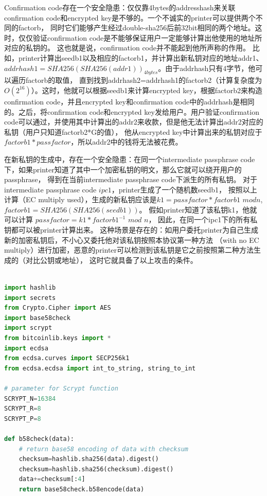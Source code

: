 Confirmation code存在一个安全隐患：仅仅靠4bytes的addresshash来关联
confirmation code和encrypted key是不够的。一个不诚实的printer可以提供两个不同的factorb，
同时它们能够产生经过double-sha256后前32bit相同的两个地址。这时，仅仅验证confirmation code是不能够保证用户一定能够计算出他使用的地址所对应的私钥的。
这也就是说，confirmation code并不能起到他所声称的作用。
比如，printer计算出seedb1以及相应的factorb1，并计算出新私钥对应的地址addr1、
$addrhash1=SHA256(SHA256(addr1))_{4bytes}$。由于addrhash只有4字节，他可以遍历factorb的取值，
直到找到addrhash2=addrhash1的factorb2（计算复杂度为$O(2^{16})$）。这时，他就可以根据seedb1来计算encrypted key，根据factorb2来构造confirmation code，并且encrypted key和confirmation 
code中的addrhash是相同的。之后，将confirmation code和encrypted key发给用户。用户验证confirmation code可以通过，并使用其中计算出的addr2来收款，但是他无法计算出addr2对应的私钥（用户只知道factorb2*G的值），
他从encrypted key中计算出来的私钥对应于 $factorb1 * passfactor$，所以addr2中的钱将无法被花费。

在新私钥的生成中，存在一个安全隐患：在同一个intermediate passphrase code下，如果printer知道了其中一个加密私钥的明文，那么它就可以绕开用户的passphrase，
得到在当前intermediate passphrase code下派生的所有私钥。
 对于intermediate passphrase code $ipc1$，printer生成了一个随机数seedb1，
 按照以上计算（EC multiply used），生成的新私钥应该是$k1=passfactor * factorb1$ 
 $mod n$, $factorb1=SHA256(SHA256(seedb1))$。 假如printer知道了该私钥k1，他就可以计算 
 $passfactor=k1 * factorb1^{-1}$ $mod$ $n$， 因此，在同一个ipc1下的所有私钥都可以被printer计算出来。  
这种场景是存在的：如用户委托printer为自己生成新的加密私钥后，不小心又委托他对该私钥按照本协议第一种方法
（with no EC multiply）进行加密，恶意的printer可以检测到该私钥是它之前按照第二种方法生成的（对比公钥或地址），
这时它就具备了以上攻击的条件。

\begin{lstlisting}[language=python, caption = 测试代码, label=lst-baddersig]

import hashlib 
import secrets
from Crypto.Cipher import AES
import base58check
import scrypt
from bitcoinlib.keys import *
import ecdsa
from ecdsa.curves import SECP256k1
from ecdsa.ecdsa import int_to_string, string_to_int

# parameter for Scrypt function
SCRYPT_N=16384
SCRYPT_R=8
SCRYPT_P=8

def b58check(data):
	# return base58 encoding of data with checksum
	checksum=hashlib.sha256(data).digest()
	checksum=hashlib.sha256(checksum).digest()
	data+=checksum[:4]
	return base58check.b58encode(data)
\end{lstlisting}


